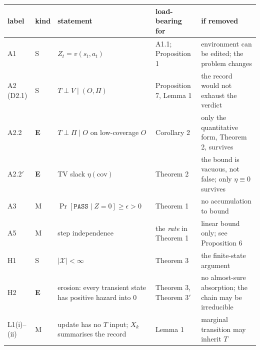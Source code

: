 \documentclass[11pt,a4paper]{article}
\newcounter{none}
\begin{document}
{\def\LTcaptype{none} %
\begin{longtable}[]{@{}
  >{\raggedright\arraybackslash}p{}
  >{\raggedright\arraybackslash}p{}
  >{\raggedright\arraybackslash}p{}
  >{\raggedright\arraybackslash}p{}
  >{\raggedright\arraybackslash}p{}@{}}
\toprule\noalign{}
\begin{minipage}[b]{\linewidth}\raggedright
label
\end{minipage} & \begin{minipage}[b]{\linewidth}\raggedright
kind
\end{minipage} & \begin{minipage}[b]{\linewidth}\raggedright
statement
\end{minipage} & \begin{minipage}[b]{\linewidth}\raggedright
load-bearing for
\end{minipage} & \begin{minipage}[b]{\linewidth}\raggedright
if removed
\end{minipage} \\
\midrule\noalign{}
\endhead
\bottomrule\noalign{}
\endlastfoot
A1 & S & \(Z_t=v(s_t,a_t)\) & A1.1; Proposition 1 & environment can be edited; the problem changes \\
A2 (D2.1) & S & \(T\perp V\mid(O,\Pi)\) & Proposition 7, Lemma 1 & the record would not exhaust the verdict \\
A2.2 & \textbf{E} & \(T\perp\Pi\mid O\) on low-coverage \(O\) & Corollary 2 & only the quantitative form, Theorem 2, survives \\
A2.2\('\) & \textbf{E} & TV slack \(\eta(\mathrm{cov})\) & Theorem 2 & the bound is vacuous, not false; only \(\eta\equiv0\) survives \\
A3 & M & \(\Pr[\texttt{PASS}\mid Z=0]\ge\epsilon>0\) & Theorem 1 & no accumulation to bound \\
A5 & M & step independence & the \emph{rate} in Theorem 1 & linear bound only; see Proposition 6 \\
H1 & S & \(\lvert\mathcal X\rvert<\infty\) & Theorem 3 & the finite-state argument \\
H2 & \textbf{E} & erosion: every transient state has positive hazard into \(0\) & Theorem 3, Theorem 3\('\) & no almost-sure absorption; the chain may be irreducible \\
L1(i)--(ii) & M & update has no \(T\) input; \(X_k\) summarises the record & Lemma 1 & marginal transition may inherit \(T\) \\
\end{longtable}
}
\end{document}
